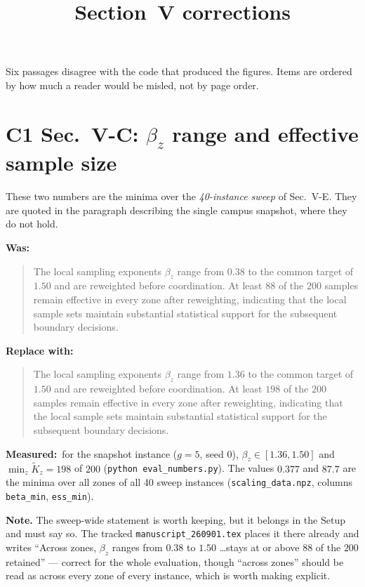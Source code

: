 \documentclass[10pt]{article}
\title{Section~V corrections}
\author{}
\date{}
\newcommand{\Was}{\par\smallskip\noindent\textbf{\textcolor{red!70!black}{Was:}}\par\nopagebreak}
\newcommand{\Now}{\par\smallskip\noindent\textbf{\textcolor{green!35!black}{Replace with:}}\par\nopagebreak}
\newcommand{\Why}{\par\smallskip\noindent\textbf{Measured:}\ }
\begin{document}
\maketitle
\vspace{-2\baselineskip}

Six passages disagree with the code that produced the figures. Items are
ordered by how much a reader would be misled, not by page order.

\section*{C1 \quad Sec.~V-C: $\beta_z$ range and effective sample size}

These two numbers are the minima over the \emph{40-instance sweep} of
Sec.~V-E. They are quoted in the paragraph describing the single campus
snapshot, where they do not hold.

\Was
\begin{quote}
The local sampling exponents $\beta_z$ range from $0.38$ to the common
target of $1.50$ and are reweighted before coordination. At least $88$ of
the $200$ samples remain effective in every zone after reweighting,
indicating that the local sample sets maintain substantial statistical
support for the subsequent boundary decisions.
\end{quote}

\Now
\begin{quote}
The local sampling exponents $\beta_z$ range from $1.36$ to the common
target of $1.50$ and are reweighted before coordination. At least $198$ of
the $200$ samples remain effective in every zone after reweighting,
indicating that the local sample sets maintain substantial statistical
support for the subsequent boundary decisions.
\end{quote}

\Why for the snapshot instance ($g=5$, seed $0$), $\beta_z\in[1.36,1.50]$
and $\min_z\widetilde K_z=198$ of $200$
(\texttt{python eval\_numbers.py}). The values $0.377$ and $87.7$ are the
minima over all zones of all 40 sweep instances
(\texttt{scaling\_data.npz}, columns \texttt{beta\_min}, \texttt{ess\_min}).

\medskip\noindent\textbf{Note.} The sweep-wide statement is worth keeping,
but it belongs in the Setup and must say so. The tracked
\texttt{manuscript\_260901.tex} places it there already and writes
``Across zones, $\beta_z$ ranges from $0.38$ to $1.50$ \ldots stays at or
above $88$ of the $200$ retained'' --- correct for the whole evaluation,
though ``across zones'' should be read as across every zone of every
instance, which is worth making explicit.
\end{document}
